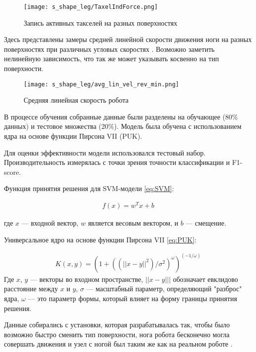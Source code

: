 \begin{figure}[H]
    \centering\texttt{[image: s\_shape\_leg/TaxelIndForce.png]}
    \caption{Запись активных такселей на разных поверхностях}
    \label{fig:s_shape_leg/TaxelIndForce_full.png}
\end{figure}

Здесь представлены замеры средней линейной скорости движения ноги на разных поверхностях при различных угловых скоростях . Возможно заметить нелинейную зависимость, что так же может указывать косвенно на тип поверхности.
\begin{figure}[H]
    \centering\texttt{[image: s\_shape\_leg/avg\_lin\_vel\_rev\_min.png]}
    \caption{Средняя линейная скорость робота}
    \label{fig:s_shape_leg/avg_lin_vel_rev_min.png}
\end{figure}

В процессе обучения собранные данные были разделены на обучающее (80\% данных) и тестовое множества (20\%). Модель была обучена с использованием ядра на основе функции Пирсона VII (PUK). 

Для оценки эффективности модели использовался тестовый набор. Производительность измерялась с точки зрения точности классификации и F1-score.

Функция принятия решения для SVM-модели \eqref{eq:SVM}:

\begin{align}
    \label{eq:SVM}
    f(x) = w^T x + b
\end{align}

где $x$ --- входной вектор, $w$ является весовым вектором, и $b$ --- смещение.

Универсальное ядро на основе функции Пирсона VII \eqref{eq:PUK}:

\begin{align}
    \label{eq:PUK}
    K(x, y) = (1 + ((||x - y||^2)/\sigma^2)^\omega)^{(-1/\omega)}
\end{align}
Где $x$, $y$ --- векторы во входном пространстве, $||x - y|||$ обозначает евклидово расстояние между $x$ и $y$, $\sigma$ --- масштабный параметр, определяющий "разброс" ядра, $\omega$ --- это параметр формы, который влияет на форму границы принятия решения.

Данные собирались с установки, которая разрабатывалась так, чтобы было возможно быстро сменить тип поверхности, нога робота бесконечно могла совершать движения и узел с ногой был таким же как на реальном роботе .

